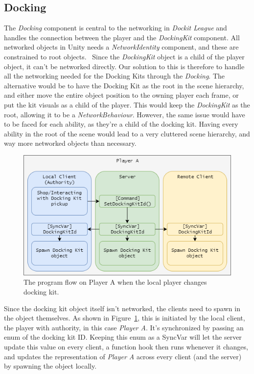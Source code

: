 \subsection{Docking}
\label{sec:docking}
The \emph{Docking} component is central to the networking in \emph{Dockit League} and handles the connection between the player and the \emph{DockingKit} component. All networked objects in Unity needs a \emph{NetworkIdentity} component, and these are constrained to root objects.~\cite{unityUNETSpawning} Since the \emph{DockingKit} object is a child of the player object, it can't be networked directly. Our solution to this is therefore to handle all the networking needed for the Docking Kits through the \emph{Docking}. The alternative would be to have the Docking Kit as the root in the scene hierarchy, and either move the entire object position to the owning player each frame, or put the kit visuals as a child of the player. This would keep the \emph{DockingKit} as the root, allowing it to be a \emph{NetworkBehaviour}. However, the same issue would have to be faced for each ability, as they're a child of the docking kit. Having every ability in the root of the scene would lead to a very cluttered scene hierarchy, and way more networked objects than necessary.

\begin{figure}[tbph]
  \centering
  \includegraphics[width=.9\textwidth]{images/CommandSetDockingKit}
  \caption[Program flow on changing docking kit]{The program flow on Player A when the local player changes docking kit.}
  \label{fig:commandSetDockingKit}
\end{figure}

Since the docking kit object itself isn't networked, the clients need to spawn in the object themselves. As shown in Figure~\ref{fig:commandSetDockingKit}, this is initiated by the local client, the player with authority, in this case \emph{Player A}. It's synchronized by passing an enum of the docking kit ID. Keeping this enum as a SyncVar will let the server update this value on every client, a function hook then runs whenever it changes, and updates the representation of \emph{Player A} across every client (and the server) by spawning the object locally.

